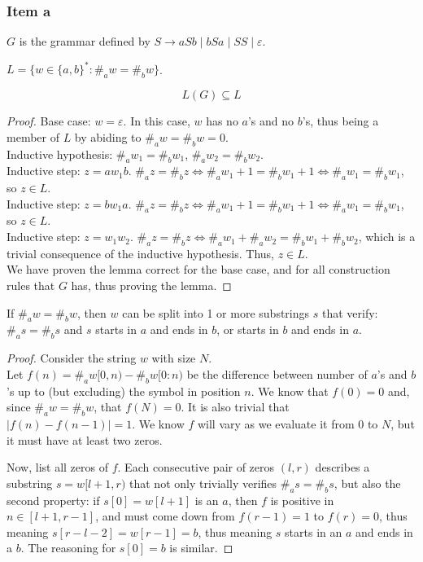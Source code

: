 {\subsubsection{Item a}
\begin{definition}
$G$ is the grammar defined by $S \rightarrow aSb\mid bSa\mid SS\mid \varepsilon$.
\end{definition}
\begin{definition}
$L=\{w \in \{a,b\}^*\colon \#_aw=\#_bw\}$.
\end{definition}
\begin{lemma} \label{lem:AimpB}
\begin{equation*}
	L(G) \subseteq L
\end{equation*}
\end{lemma}
\begin{proof}
Base case: $w=\varepsilon$. In this case, $w$ has no $a$'s and no $b$'s, thus being a member of $L$ by abiding to $\#_aw=\#_bw=0$.\\
Inductive hypothesis: $\#_aw_1=\#_bw_1$, $\#_aw_2=\#_bw_2$.\\
Inductive step: $z=aw_1b$. $\#_az=\#_bz \iff \#_aw_1+1=\#_bw_1+1 \iff \#_aw_1=\#_bw_1$, so $z \in L$.\\
Inductive step: $z=bw_1a$. $\#_az=\#_bz \iff \#_aw_1+1=\#_bw_1+1 \iff \#_aw_1=\#_bw_1$, so $z \in L$.\\
Inductive step: $z=w_1w_2$. $\#_az=\#_bz \iff \#_aw_1+\#_aw_2=\#_bw_1+\#_bw_2$, which is a trivial consequence of the inductive hypothesis. Thus, $z \in L$.\\
We have proven the lemma correct for the base case, and for all construction rules that $G$ has, thus proving the lemma.
\end{proof}
\begin{lemma} \label{lem:simplemma}
If $\#_aw=\#_bw$, then $w$ can be split into 1 or more substrings $s$ that verify: $\#_as=\#_bs$ and $s$ starts in $a$ and ends in $b$, or starts in $b$ and ends in $a$.
\end{lemma}
\begin{proof}
Consider the string $w$ with size $N$.\\
Let $f(n)=\#_aw[0,n)-\#_bw[0:n)$ be the difference between number of $a$'s and $b$'s up to (but excluding) the symbol in position $n$. We know that $f(0)=0$ and, since $\#_aw=\#_bw$, that $f(N)=0$. It is also trivial that $|f(n)-f(n-1)| = 1$. We know $f$ will vary as we evaluate it from $0$ to $N$, but it must have at least two zeros.\par
Now, list all zeros of $f$. Each consecutive pair of zeros $(l,r)$ describes a substring $s=w[l+1,r)$ that not only trivially verifies $\#_as=\#_bs$, but also the second property: if $s[0] = w[l+1]$ is an $a$, then $f$ is positive in $n \in [l+1,r-1]$, and must come down from $f(r-1)=1$ to $f(r)=0$, thus meaning $s[r-l-2]=w[r-1]=b$, thus meaning $s$ starts in an $a$ and ends in a $b$. The reasoning for $s[0]=b$ is similar.

\end{proof}}

